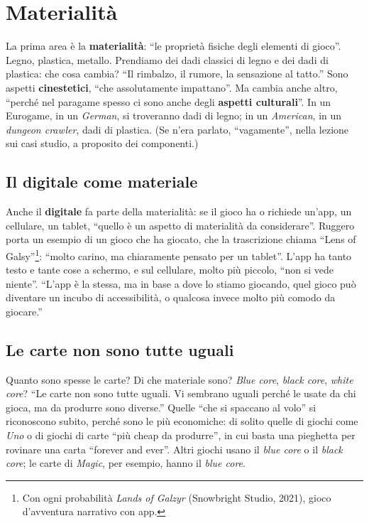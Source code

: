 \section{Materialità}
\label{a10:sec:materialita}



La prima area è la \textbf{materialità}: ``le proprietà fisiche degli elementi di
gioco''. Legno, plastica, metallo. Prendiamo dei dadi classici di legno e dei dadi di
plastica: che cosa cambia? ``Il rimbalzo, il rumore, la sensazione al tatto.'' Sono
aspetti \textbf{cinestetici}, ``che assolutamente impattano''. Ma cambia anche altro,
``perché nel paragame spesso ci sono anche degli \textbf{aspetti culturali}''. In un
Eurogame, in un \emph{German}, si troveranno dadi di legno; in un \emph{American}, in un
\emph{dungeon crawler}, dadi di plastica. (Se n'era parlato, ``vagamente'', nella
lezione sui casi studio, a proposito dei componenti.)

\subsection{Il digitale come materiale}

Anche il \textbf{digitale} fa parte della materialità: se il gioco ha o richiede
un'app, un cellulare, un tablet, ``quello è un aspetto di materialità da considerare''.
Ruggero porta un esempio di un gioco che ha giocato, che la trascrizione chiama ``Lens
of Galsy''\footnote{Con ogni probabilità \emph{Lands of Galzyr} (Snowbright Studio,
2021), gioco d'avventura narrativo con app.}: ``molto carino, ma chiaramente pensato per
un tablet''. L'app ha tanto testo e tante cose a schermo, e sul cellulare, molto più
piccolo, ``non si vede niente''. ``L'app è la stessa, ma in base a dove lo stiamo
giocando, quel gioco può diventare un incubo di accessibilità, o qualcosa invece molto
più comodo da giocare.''

\subsection{Le carte non sono tutte uguali}

Quanto sono spesse le carte? Di che materiale sono? \emph{Blue core}, \emph{black
core}, \emph{white core}? ``Le carte non sono tutte uguali. Vi sembrano uguali perché le
usate da chi gioca, ma da produrre sono diverse.'' Quelle ``che si spaccano al volo'' si
riconoscono subito, perché sono le più economiche: di solito quelle di giochi come
\emph{Uno} o di giochi di carte ``più cheap da produrre'', in cui basta una pieghetta
per rovinare una carta ``forever and ever''. Altri giochi usano il \emph{blue core} o il
\emph{black core}; le carte di \emph{Magic}, per esempio, hanno il \emph{blue core}.

